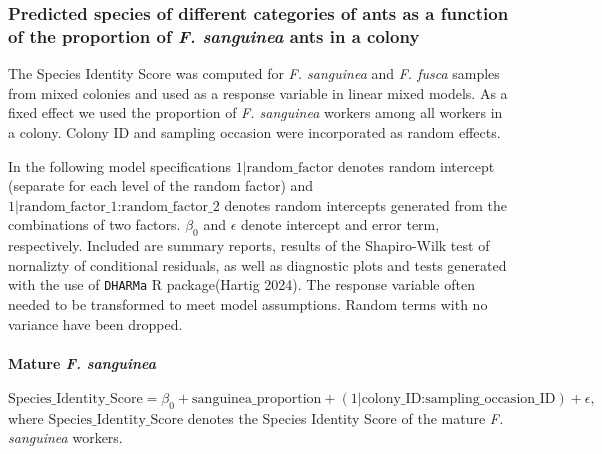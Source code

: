\documentclass[
]{article}
\begin{document}
\subsubsection{\texorpdfstring{Predicted species of different categories of ants as a function of the proportion of \emph{F. sanguinea} ants in a colony}{Predicted species of different categories of ants as a function of the proportion of F. sanguinea ants in a colony}}\label{predicted-species-of-different-categories-of-ants-as-a-function-of-the-proportion-of-f.-sanguinea-ants-in-a-colony}

The Species Identity Score was computed for \emph{F. sanguinea} and \emph{F. fusca} samples from mixed colonies and used as a response variable in linear mixed models. As a fixed effect we used the proportion of \emph{F. sanguinea} workers among all workers in a colony. Colony ID and sampling occasion were incorporated as random effects.

In the following model specifications \(1|\text{random_factor}\) denotes random intercept (separate for each level of the random factor) and \(1|\text{random_factor_1:random_factor_2}\) denotes random intercepts generated from the combinations of two factors. \(\beta_{0}\) and \(\epsilon\) denote intercept and error term, respectively. Included are summary reports, results of the Shapiro-Wilk test of nornalizty of conditional residuals, as well as diagnostic plots and tests generated with the use of \texttt{DHARMa} R package(Hartig 2024). The response variable often needed to be transformed to meet model assumptions. Random terms with no variance have been dropped.

\paragraph{\texorpdfstring{Mature \emph{F. sanguinea}}{Mature F. sanguinea}}\label{mature-f.-sanguinea}

\[
\text{Species_Identity_Score} = \beta_0 + \text{sanguinea_proportion} + (1|\text{colony_ID:sampling_occasion_ID}) + \epsilon,
\]
where \(\text{Species_Identity_Score}\) denotes the Species Identity Score of the mature \emph{F. sanguinea} workers.
\end{document}
